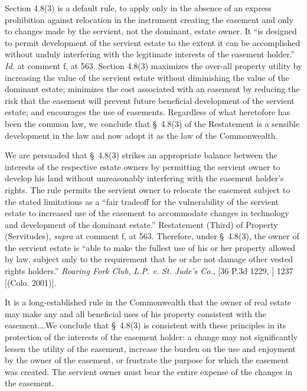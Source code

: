 Section 4.8(3) is a default rule, to apply only in the absence of an express
prohibition against relocation in the instrument creating the easement and only
to changes made by the servient, not the dominant, estate
owner. It ``is designed to permit development of the servient estate to the
extent it can be accomplished without unduly interfering with the legitimate
interests of the easement holder.'' \textit{Id.} at comment f, at 563. Section
4.8(3) maximizes the over-all property utility by increasing the value of the
servient estate without diminishing the value of the dominant estate; minimizes
the cost associated with an easement by reducing the risk that the easement will
prevent future beneficial development of the servient estate; and encourages the
use of easements. Regardless of what heretofore has been the common law, we
conclude that \S~4.8(3) of the Restatement is a sensible development in the law
and now adopt it as the law of the Commonwealth.

We are persuaded that \S~4.8(3) strikes an appropriate balance between the
interests of the respective estate owners by permitting the servient owner to
develop his land without unreasonably interfering with the easement holder's
rights. The rule permits the servient owner to relocate the easement subject to
the stated limitations as a ``fair tradeoff for the vulnerability of the
servient estate to increased use of the easement to accommodate changes in
technology and development of the dominant estate.'' Restatement (Third) of
Property (Servitudes), \textit{supra} at comment f, at 563. Therefore, under
\S~4.8(3), the owner of the servient estate is ``able to make the fullest use of
his or her property allowed by law, subject only to the requirement that he or
she not damage other vested rights holders.'' \textit{Roaring Fork Club, L.P. v.
St. Jude's Co.},  [36 P.3d 1229, ] 1237 [(Colo. 2001)].

It is a long-established rule in the Commonwealth that the owner of real estate
may make any and all beneficial uses of his property consistent with the
easement.\ldots We conclude that \S~4.8(3) is consistent with these principles
in its protection of the interests of the easement holder: a change may not
significantly lessen the utility of the easement, increase the burden on the use
and enjoyment by the owner of the easement, or frustrate the purpose for which
the easement was created. The servient owner must bear the entire expense of the
changes in the easement. 

